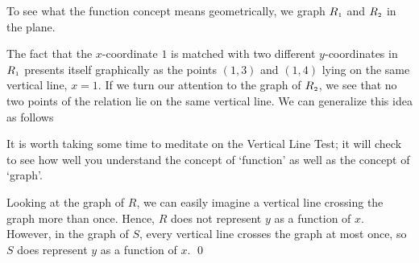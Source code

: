 \smallskip

To see what the function concept means geometrically, we graph $R_{\mbox{\tiny$1$}}$ and $R_{\mbox{\tiny$2$}}$ in the plane.



\medskip



The fact that the $x$-coordinate $1$ is matched with two different $y$-coordinates in $R_{\mbox{\tiny$1$}}$ presents itself graphically as the points $(1,3)$ and $(1,4)$ lying on the same vertical line, $x=1$.  If we turn our attention to the graph of $R_{\mbox{\tiny$2$}}$, we see that no two points of the relation lie on the same vertical line.  We can generalize this idea as follows

\medskip




It is worth taking some time to meditate on the Vertical Line Test; it will check to see how well you understand the concept of `function' as well as the concept of `graph'.

{
Looking at the graph of $R$, we can easily imagine a vertical line crossing the graph more than once.  Hence, $R$ does not represent $y$ as a function of $x$.  However, in the graph of $S$, every vertical line crosses the graph at most once, so $S$ does represent $y$ as a function of $x$.  \qed
}


